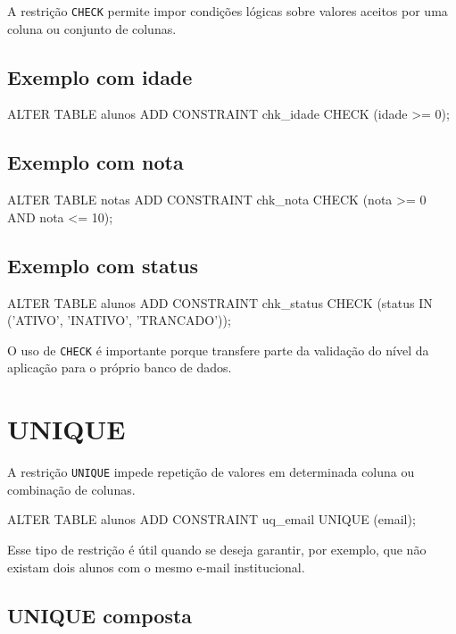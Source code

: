 A restrição \texttt{CHECK} permite impor condições lógicas sobre valores aceitos por uma coluna ou conjunto de colunas.

\subsection{Exemplo com idade}

\begin{sqlcode}
ALTER TABLE alunos
ADD CONSTRAINT chk_idade
CHECK (idade >= 0);
\end{sqlcode}

\subsection{Exemplo com nota}

\begin{sqlcode}
ALTER TABLE notas
ADD CONSTRAINT chk_nota
CHECK (nota >= 0 AND nota <= 10);
\end{sqlcode}

\subsection{Exemplo com status}

\begin{sqlcode}
ALTER TABLE alunos
ADD CONSTRAINT chk_status
CHECK (status IN ('ATIVO', 'INATIVO', 'TRANCADO'));
\end{sqlcode}

O uso de \texttt{CHECK} é importante porque transfere parte da validação do nível da aplicação para o próprio banco de dados.

\section{UNIQUE}

A restrição \texttt{UNIQUE} impede repetição de valores em determinada coluna ou combinação de colunas.

\begin{sqlcode}
ALTER TABLE alunos
ADD CONSTRAINT uq_email UNIQUE (email);
\end{sqlcode}

Esse tipo de restrição é útil quando se deseja garantir, por exemplo, que não existam dois alunos com o mesmo e-mail institucional.

\subsection{UNIQUE composta}

